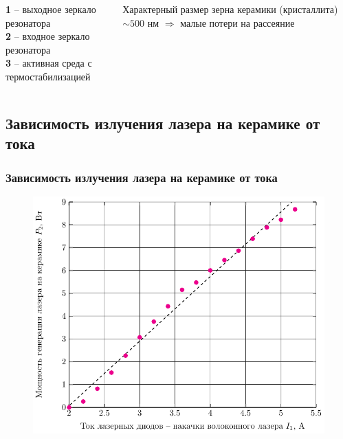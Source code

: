 \documentclass[10pt,pdf,hyperref={unicode}, dvipsnames]{beamer}
\newcommand\frametitless[1]{\subsection{#1}\frametitle{#1}}
\begin{document}
\begin{frame}[t]
	\begin{columns}
		\begin{column}{0.6\textwidth}
			\textbf{1} -- выходное зеркало резонатора \\
			\textbf{2} -- входное зеркало резонатора \\
			\textbf{3} -- активная среда с термостабилизацией
		\end{column}
		\begin{column}{0.4\textwidth}
			Характерный размер зерна керамики (кристаллита) $\sim 500$ нм $\Rightarrow$ малые потери на рассеяние
		\end{column}
	\end{columns}	
\end{frame}
\begin{frame}[t]
	\frametitless{Зависимость излучения лазера на керамике от тока}
		\begin{figure}[tb]
		\centering
		\includegraphics[height=0.85\textheight]{img/P2I2}
	\end{figure}
\end{frame}
\end{document}
